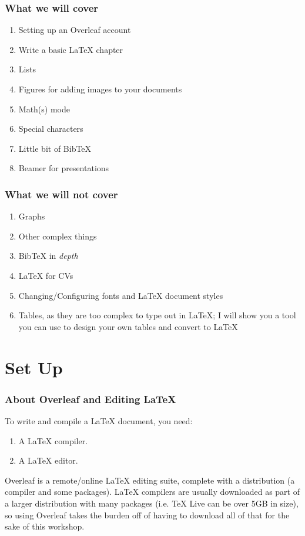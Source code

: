 \documentclass{beamer}
\begin{document}
	\begin{frame}
		\frametitle{What we will cover}
		\begin{enumerate}
			\item<1-> Setting up an Overleaf account
			\item<2-> Write a basic \LaTeX{} chapter
			\item<3-> Lists
			\item<4-> Figures for adding images to your documents
			\item<5-> Math(s) mode
			\item<6-> Special characters
			\item<7-> Little bit of Bib\TeX
			\item<8-> Beamer for presentations
		\end{enumerate}
	\end{frame}
	
	\begin{frame}
		\frametitle{What we will \textbf{not} cover}
		\begin{enumerate}
			\item<1-> Graphs
			\item<2-> Other complex things
			\item<3-> Bib\TeX{} in \textit{depth}
			\item<4-> \LaTeX{} for CVs
			\item<5-> Changing/Configuring fonts and \LaTeX{} document styles
			\item<6-> Tables, as they are too complex to type out in \LaTeX{}; I will show you a tool you can use to design your own tables and convert to \LaTeX{}
		\end{enumerate}
	\end{frame}
	
	\section{Set Up}
	
	\begin{frame}
		\frametitle{About Overleaf and Editing \LaTeX{}}
		To write and compile a \LaTeX{} document, you need: \pause
		\begin{enumerate}
			\item A \LaTeX{} compiler.\pause
			\item A \LaTeX{} editor.
		\end{enumerate}
		\pause
		Overleaf is a remote/online \LaTeX{} editing suite, complete with a distribution (a compiler and some packages). \pause \LaTeX{} compilers are usually downloaded as part of a larger distribution with many packages (i.e. \TeX{} Live can be over 5GB in size), so using Overleaf takes the burden off of having to download all of that for the sake of this workshop.
	\end{frame}
	
\end{document}
